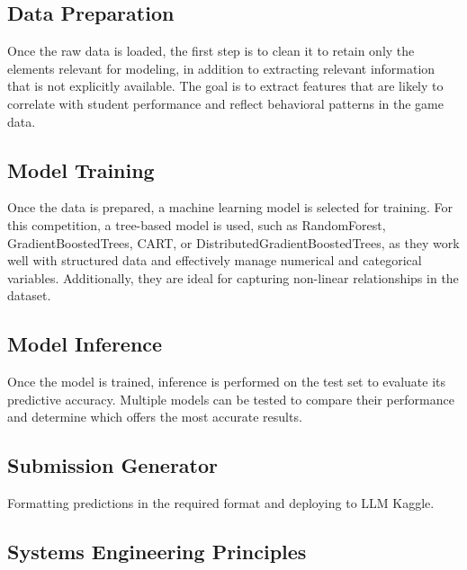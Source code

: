 \documentclass{article}
\begin{document}
\subsection*{Data Preparation}

Once the raw data is loaded, the first step is to clean it to retain only the elements relevant for modeling, in addition to extracting relevant information that is not explicitly available. The goal is to extract features that are likely to correlate with student performance and reflect behavioral patterns in the game data.

\subsection*{Model Training}

Once the data is prepared, a machine learning model is selected for training. For this competition, a tree-based model is used, such as RandomForest, GradientBoostedTrees, CART, or DistributedGradientBoostedTrees, as they work well with structured data and effectively manage numerical and categorical variables. Additionally, they are ideal for capturing non-linear relationships in the dataset.

\subsection*{Model Inference}

Once the model is trained, inference is performed on the test set to evaluate its predictive accuracy. Multiple models can be tested to compare their performance and determine which offers the most accurate results.

\subsection*{Submission Generator}

Formatting predictions in the required format
and deploying to LLM Kaggle.

\subsection*{Systems Engineering Principles}
\end{document}
